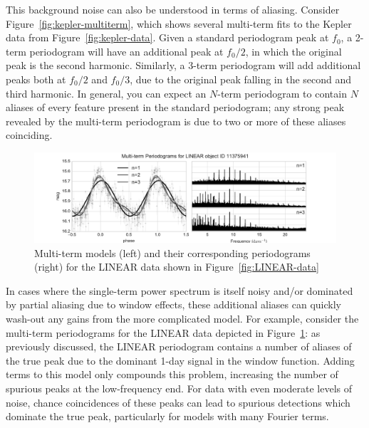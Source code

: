 \documentclass[preprint]{aastex}
\newcommand{\fig}[1]{Figure~\ref{fig:#1}}
\newcommand{\figlabel}[1]{\label{fig:#1}}
\begin{document}
This background noise can also be understood in terms of aliasing.
Consider \fig{kepler-multiterm}, which shows several multi-term fits to the
Kepler data from \fig{kepler-data}.
Given a standard periodogram peak at $f_0$, a 2-term periodogram will have an
additional peak at $f_0 / 2$, in which the original peak is the second
harmonic. Similarly, a 3-term periodogram will add additional peaks both at
$f_0 / 2$ and $f_0 / 3$, due to the original peak falling in the second and
third harmonic.
In general, you can expect an $N$-term periodogram to contain $N$ aliases of
every feature present in the standard periodogram; any strong peak revealed
by the multi-term periodogram is due to two or more of these aliases coinciding.

\begin{figure}[ht]
  \centering
  \includegraphics[width=\textwidth]{fig22_LINEAR_multiterm}
  \caption{Multi-term models (left) and their corresponding periodograms (right)
    for the LINEAR data shown in \fig{LINEAR-data}
    \figlabel{LINEAR-multiterm}}
\end{figure}

In cases where the single-term power spectrum is itself noisy and/or dominated
by partial aliasing due to window effects, these additional aliases can
quickly wash-out any gains from the more complicated model.
For example, consider the multi-term periodograms for the LINEAR data
depicted in \fig{LINEAR-multiterm}: as previously discussed,
the LINEAR periodogram contains a number of aliases of the true peak due
to the dominant 1-day signal in the window function.
Adding terms to this model only compounds this problem, increasing the number of
spurious peaks at the low-frequency end.
For data with even moderate levels of noise, chance coincidences of these
peaks can lead to spurious detections which dominate the true peak, particularly
for models with many Fourier terms.
\end{document}
